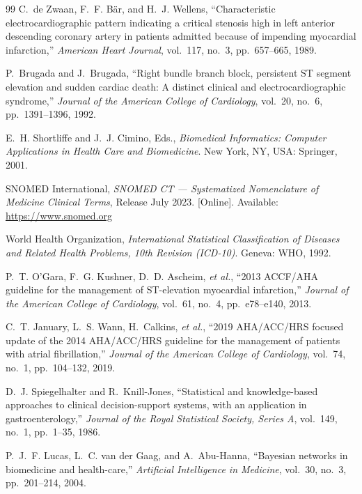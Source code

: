 \documentclass[journal]{IEEEtran}
\begin{document}
\begin{thebibliography}{99}
C.~de Zwaan, F.~F. Bär, and H.~J. Wellens,
``Characteristic electrocardiographic pattern indicating a critical
stenosis high in left anterior descending coronary artery in patients
admitted because of impending myocardial infarction,''
\textit{American Heart Journal}, vol.~117, no.~3, pp.~657--665, 1989.

P.~Brugada and J.~Brugada,
``Right bundle branch block, persistent ST segment elevation and sudden
cardiac death: A distinct clinical and electrocardiographic syndrome,''
\textit{Journal of the American College of Cardiology},
vol.~20, no.~6, pp.~1391--1396, 1992.

E.~H. Shortliffe and J.~J. Cimino, Eds.,
\textit{Biomedical Informatics: Computer Applications in Health Care
and Biomedicine}.
New York, NY, USA: Springer, 2001.

SNOMED International,
\textit{SNOMED CT — Systematized Nomenclature of Medicine Clinical
Terms}, Release July 2023. [Online].
Available: \url{https://www.snomed.org}

World Health Organization,
\textit{International Statistical Classification of Diseases and
Related Health Problems, 10th Revision (ICD-10)}.
Geneva: WHO, 1992.

P.~T. O'Gara, F.~G. Kushner, D.~D. Ascheim, \textit{et al.},
``2013 ACCF/AHA guideline for the management of ST-elevation
myocardial infarction,''
\textit{Journal of the American College of Cardiology},
vol.~61, no.~4, pp.~e78--e140, 2013.

C.~T. January, L.~S. Wann, H.~Calkins, \textit{et al.},
``2019 AHA/ACC/HRS focused update of the 2014 AHA/ACC/HRS guideline
for the management of patients with atrial fibrillation,''
\textit{Journal of the American College of Cardiology},
vol.~74, no.~1, pp.~104--132, 2019.

D.~J. Spiegelhalter and R.~Knill-Jones,
``Statistical and knowledge-based approaches to clinical
decision-support systems, with an application in gastroenterology,''
\textit{Journal of the Royal Statistical Society, Series A},
vol.~149, no.~1, pp.~1--35, 1986.

P.~J.~F. Lucas, L.~C. van der Gaag, and A.~Abu-Hanna,
``Bayesian networks in biomedicine and health-care,''
\textit{Artificial Intelligence in Medicine},
vol.~30, no.~3, pp.~201--214, 2004.


\end{thebibliography}
\end{document}
